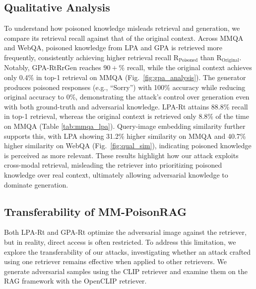 \subsection{Qualitative Analysis } 
To understand how poisoned knowledge misleads retrieval and generation, we compare its retrieval recall against that of the original context. Across MMQA and WebQA, poisoned knowledge from LPA and GPA is retrieved more frequently, consistently achieving higher retrieval recall $\text{R}_{\text{Poisoned}}$ than $\text{R}_{\text{Original}}$.  Notably, GPA-RtRrGen reaches $90+\%$ recall, while the original context achieves only 0.4\% in top-1 retrieval on MMQA (Fig.~\ref{fig:gpa_analysis}). The generator produces poisoned responses (e.g., ``Sorry'') with 100\% accuracy while reducing original accuracy to 0\%, demonstrating the attack's control over generation even with both ground-truth and adversarial knowledge. LPA-Rt attains 88.8\% recall in top-1 retrieval, whereas the original context is retrieved only 8.8\% of the time on MMQA (Table \ref{tab:mmqa_lpa}). Query-image embedding similarity further supports this, with LPA showing 31.2\% higher similarity on MMQA and 40.7\% higher similarity on WebQA (Fig.~\ref{fig:qual_sim}), indicating poisoned knowledge is perceived as more relevant. These results highlight how our attack exploits cross-modal retrieval, misleading the retriever into prioritizing poisoned knowledge over real context, ultimately allowing adversarial knowledge to dominate generation. 



\subsection{Transferability of MM-PoisonRAG}
\label{sec:transfer}

Both LPA-Rt and GPA-Rt optimize the adversarial image against the retriever, but in reality, direct access is often restricted. To address this limitation, we explore the transferability of our attacks, investigating whether an attack crafted using one retriever remains effective when applied to other retrievers. We generate adversarial samples using the CLIP retriever and examine them on the RAG framework with the OpenCLIP retriever. 

